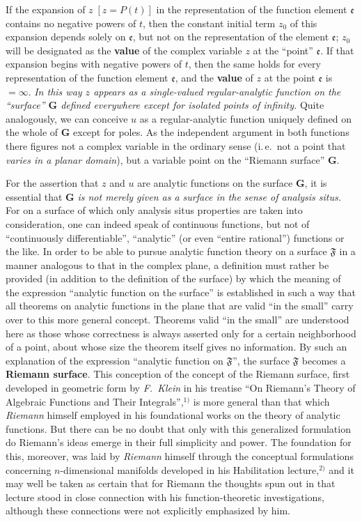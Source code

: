 \documentclass{article}
\begin{document}
If the expansion of $z\;[z = P(t)]$ in the representation of the function element $\mathfrak{e}$ contains no negative powers of $t$, then the constant initial term $z_0$ of this expansion depends solely on $\mathfrak{e}$, but not on the representation of the element $\mathfrak{e}$; $z_0$ will be designated as the \textbf{value} of the complex variable $z$ at the ``point'' $\mathfrak{e}$. If that expansion begins with negative powers of $t$, then the same holds for every representation of the function element $\mathfrak{e}$, and the \textbf{value} of $z$ at the point $\mathfrak{e}$ is $=\infty$. \emph{In this way $z$ appears as a single-valued regular-analytic function on the ``surface'' $\mathbf{G}$ defined everywhere except for isolated points of infinity.} Quite analogously, we can conceive $u$ as a regular-analytic function uniquely defined on the whole of $\mathbf{G}$ except for poles. As the independent argument in both functions there figures not a complex variable in the ordinary sense (i.\,e.\ not a point that \emph{varies in a planar domain}), but a variable point on the ``Riemann surface'' $\mathbf{G}$.

For the assertion that $z$ and $u$ are analytic functions on the surface $\mathbf{G}$, it is essential that $\mathbf{G}$ \emph{is not merely given as a surface in the sense of analysis situs.} For on a surface of which only analysis situs properties are taken into consideration, one can indeed speak of continuous functions, but not of ``continuously differentiable'', ``analytic'' (or even ``entire rational'') functions or the like. In order to be able to pursue analytic function theory on a surface $\mathfrak{F}$ in a manner analogous to that in the complex plane, a definition must rather be provided (in addition to the definition of the surface) by which the meaning of the expression ``analytic function on the surface'' is established in such a way that all theorems on analytic functions in the plane that are valid ``in the small'' carry over to this more general concept. Theorems valid ``in the small'' are understood here as those whose correctness is always asserted only for a certain neighborhood of a point, about whose size the theorem itself gives no information. By such an explanation of the expression ``analytic function on $\mathfrak{F}$'', the surface $\mathfrak{F}$ becomes a \textbf{Riemann surface}. This conception of the concept of the Riemann surface, first developed in geometric form by \emph{F.~Klein} in his treatise ``On Riemann's Theory of Algebraic Functions and Their Integrals'',${}^{1)}$ is more general than that which \emph{Riemann} himself employed in his foundational works on the theory of analytic functions. But there can be no doubt that only with this generalized formulation do Riemann's ideas emerge in their full simplicity and power. The foundation for this, moreover, was laid by \emph{Riemann} himself through the conceptual formulations concerning $n$-dimensional manifolds developed in his Habilitation lecture,${}^{2)}$ and it may well be taken as certain that for Riemann the thoughts spun out in that lecture stood in close connection with his function-theoretic investigations, although these connections were not explicitly emphasized by him.
\end{document}
